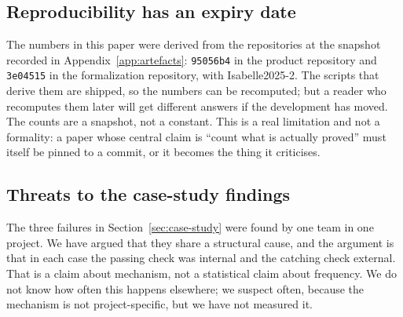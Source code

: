 \subsection{Reproducibility has an expiry date}

The numbers in this paper were derived from the repositories at the snapshot
recorded in Appendix~\ref{app:artefacts}: \texttt{95056b4} in the product
repository and \texttt{3e04515} in the formalization repository, with
Isabelle2025-2. The scripts that derive them are shipped, so the numbers can be
recomputed; but a reader who recomputes them later will get different answers if
the development has moved. The counts are a snapshot, not a constant. This is a
real limitation and not a formality: a paper whose central claim is
``count what is actually proved'' must itself be pinned to a commit, or it
becomes the thing it criticises.

\subsection{Threats to the case-study findings}

The three failures in Section~\ref{sec:case-study} were found by one team in one
project. We have argued that they share a structural cause, and the argument is
that in each case the passing check was internal and the catching check external.
That is a claim about mechanism, not a statistical claim about frequency. We do
not know how often this happens elsewhere; we suspect often, because the
mechanism is not project-specific, but we have not measured it.
